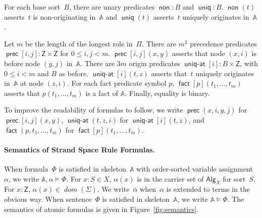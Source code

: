 \documentclass[12pt]{article}
\newcommand{\cn}[1]{\ensuremath{\operatorname{\mathsf{#1}}}}
\newcommand{\fn}[1]{\ensuremath{\operatorname{\mathit{#1}}}}
\newcommand{\sdom}{\fn{dom}}
\newcommand{\srt}[1]{\ensuremath{\mathsf{#1}}}
\newcommand{\skel}{\mathbb{A}}
\newcommand{\alg}[1]{\ensuremath{\mathsf{#1}}}
\newcommand{\msg}{\alg{Alg}}
\newcommand{\ssp}{\Sigma}
\begin{document}
For each base sort~$B$, there are unary predicates $\cn{non}\colon B$
and $\cn{uniq}\colon B$.  $\cn{non}(t)$ asserts~$t$ is non-originating
in~$\skel$ and $\cn{uniq}(t)$ asserts~$t$ uniquely originates in~$\skel$.

Let $m$ be the length of the longest role in~$\Pi$.  There are $m^2$
precedence predicates $\cn{prec}[i,j]:\srt{Z}\times\srt{Z}$ for $0\leq
i,j< m$.  $\cn{prec}[i,j](x,y)$ asserts that node $(x,i)$ is before
node $(y,j)$ in~$\skel$.  There are $3m$ origin predicates
$\cn{uniq-at}[i]:B\times\srt{Z}$, with $0\leq i< m$ and $B$ as before.
$\cn{uniq-at}[i](t,z)$ asserts that~$t$ uniquely originates in~$\skel$
at node $(z,i)$.  For each fact predicate symbol $p$,
$\cn{fact}[p](t_1,\ldots,t_m)$ asserts that $p(t_1,\ldots,t_m)$ is a
fact of $\skel$.  Finally, equality is binary.

To improve the readability of formulas to follow, we write
$\cn{prec}(x,i,y,j)$ for $\cn{prec}[i,j](x,y)$, $\cn{uniq-at}(t,z,i)$
for $\cn{uniq-at}[i](t,z)$, and $\cn{fact}(p,t_1,\ldots,t_m)$ for
$\cn{fact}[p](t_1,\ldots,t_m)$.

\paragraph{Semantics of Strand Space Rule Formulas.}

When formula~$\Phi$ is satisfied in skeleton~$\skel$ with order-sorted
variable assignment $\alpha$, we write $\skel,\alpha\models\Phi$.  For
$x:S\in X$, $\alpha(x)$ is in the carrier set of $\msg_X$ for
sort~$S$.  For $x:\srt{Z}$, $\alpha(x)\in\sdom(\ssp)$.  We
write~$\bar\alpha$ when~$\alpha$ is extended to terms in the obvious
way.  When sentence~$\Phi$ is satisfied in skeleton~$\skel$, we write
$\skel\models\Phi$.  The semantics of atomic formulas is given in
Figure~\ref{fig:semantics}.
\end{document}
